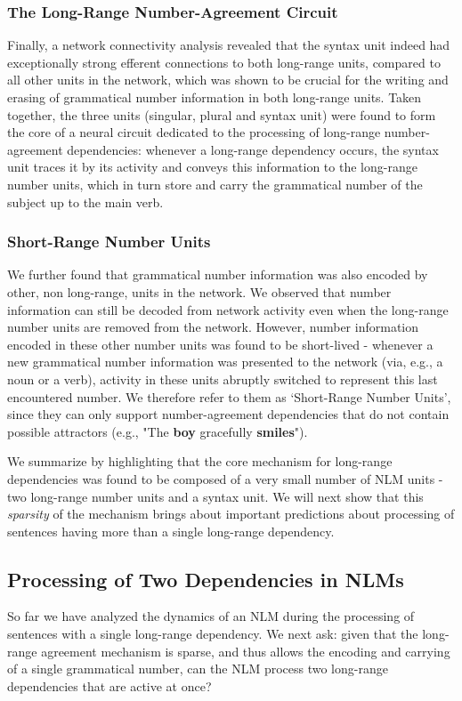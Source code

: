 \subsubsection{The Long-Range Number-Agreement Circuit}
Finally, a network connectivity analysis revealed that the syntax unit indeed had exceptionally strong efferent connections to both long-range units, compared to all other units in the network, which was shown to be crucial for the writing and erasing of grammatical number information in both long-range units. Taken together, the three units (singular, plural and syntax unit) were found to form the core of a neural circuit dedicated to the processing of long-range number-agreement dependencies: whenever a long-range dependency occurs, the syntax unit traces it by its activity and conveys this information to the long-range number units, which in turn store and carry the grammatical number of the subject up to the main verb. 

\subsubsection{Short-Range Number Units}
We further found that grammatical number information was also encoded by other, non long-range, units in the network. We observed that number information can still be decoded from network activity even when the long-range number units are removed from the network. However, number information encoded in these other number units was found to be short-lived - whenever a new grammatical number information was presented to the network (via, e.g., a noun or a verb), activity in these units abruptly switched to represent this last encountered number. We therefore refer to them as `Short-Range Number Units', since they can only support number-agreement dependencies that do not contain possible attractors (e.g., "The \textbf{boy} gracefully \textbf{smiles}"). 

\vspace{10pt}

We summarize by highlighting that the core mechanism for long-range dependencies was found to be composed of a very small number of NLM units - two long-range number units and a syntax unit. We will next show that this \textit{sparsity} of the mechanism brings about important predictions about processing of sentences having more than a single long-range dependency.

\subsection{Processing of Two Dependencies in NLMs}
So far we have analyzed the dynamics of an NLM during the processing of sentences with a single long-range dependency. We next ask: given that the long-range agreement mechanism is sparse, and thus allows the encoding and carrying of a single grammatical number, can the NLM process two long-range dependencies that are active at once?

